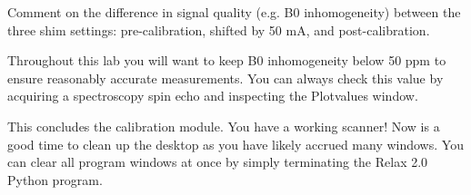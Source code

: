 \noindent{}\color{red} Comment on the difference in signal quality (e.g. B0 inhomogeneity) between the three shim settings: pre-calibration, shifted by 50 mA, and post-calibration.
\color{black}

Throughout this lab you will want to keep B0 inhomogeneity below 50 ppm to ensure reasonably accurate measurements. You can always check this value by acquiring a spectroscopy spin echo and inspecting the Plotvalues window.
\vspace{5mm}

\noindent{} This concludes the calibration module. You have a working scanner! Now is a good time to clean up the desktop as you have likely accrued many windows. You can clear all program windows at once by simply terminating the Relax 2.0 Python program.





